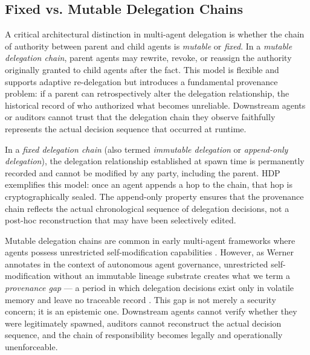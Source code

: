 \subsection{Fixed vs. Mutable Delegation Chains}

A critical architectural distinction in multi-agent delegation is whether the chain of authority between parent and child agents is \emph{mutable} or \emph{fixed}. In a \emph{mutable delegation chain}, parent agents may rewrite, revoke, or reassign the authority originally granted to child agents after the fact. This model is flexible and supports adaptive re-delegation but introduces a fundamental provenance problem: if a parent can retrospectively alter the delegation relationship, the historical record of who authorized what becomes unreliable. Downstream agents or auditors cannot trust that the delegation chain they observe faithfully represents the actual decision sequence that occurred at runtime.

In a \emph{fixed delegation chain} (also termed \emph{immutable delegation} or \emph{append-only delegation}), the delegation relationship established at spawn time is permanently recorded and cannot be modified by any party, including the parent. HDP exemplifies this model: once an agent appends a hop to the chain, that hop is cryptographically sealed. The append-only property ensures that the provenance chain reflects the actual chronological sequence of delegation decisions, not a post-hoc reconstruction that may have been selectively edited.

Mutable delegation chains are common in early multi-agent frameworks where agents possess unrestricted self-modification capabilities \citep{pressman2024autonomous}. However, as Werner annotates in the context of autonomous agent governance, unrestricted self-modification without an immutable lineage substrate creates what we term a \emph{provenance gap} — a period in which delegation decisions exist only in volatile memory and leave no traceable record \citep{werner2024autonomous}. This gap is not merely a security concern; it is an epistemic one. Downstream agents cannot verify whether they were legitimately spawned, auditors cannot reconstruct the actual decision sequence, and the chain of responsibility becomes legally and operationally unenforceable.

